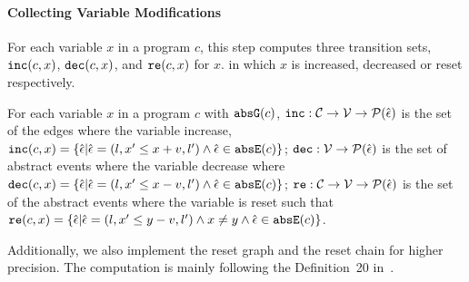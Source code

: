 \paragraph{Collecting Variable Modifications}
  For each variable $x$ in a program $c$, this step computes three transition sets, $\mathtt{inc}(c, x)$, $\mathtt{dec}(c, x)$,
  and $\mathtt{re}(c, x)$ for $x$.
  in which $x$ is increased,
  decreased
  or reset
  respectively.
  \begin{defn}
    \label{def:var_modi}
    For each variable $x$ in a program $c$ with $\mathtt{abs}{\mathtt{G}}(c)$,
    $\mathtt{inc}: \mathcal{C} \to \mathcal{V} \to \mathcal{P}(\hat{\mathtt{\epsilon}{}}) $
    is the set of the edges where the variable increase, $\inc(c, x) = \left\{ \absevent | \absevent = (l, x' \leq x + v, l') \land \absevent \in \absE(c) \right\}$;
    $\mathtt{dec}: \mathcal{V} \to \mathcal{P}(\hat{\mathtt{\epsilon}{}}) $
    is the set of abstract events where the variable decrease where
    $\dec(c, x) = \left\{\absevent| \absevent = (l,  x' \leq x - v, l') \land \absevent \in \absE(c) \right\}$;
    $\mathtt{re}: \mathcal{C} \to \mathcal{V} \to \mathcal{P}(\hat{\mathtt{\epsilon}{}}) $ is the set of the abstract events where the variable is reset such that
    $\reset(c, x) = \left\{ \absevent| \absevent = (l,  x' \leq y - v, l') \land x \neq y \land \absevent \in \absE(c) \right\}$.  
  \end{defn}
  Additionally,
  we also implement the reset graph and the reset chain for higher precision. The computation is mainly following the Definition~20 in~\cite{SinnZV17}.
